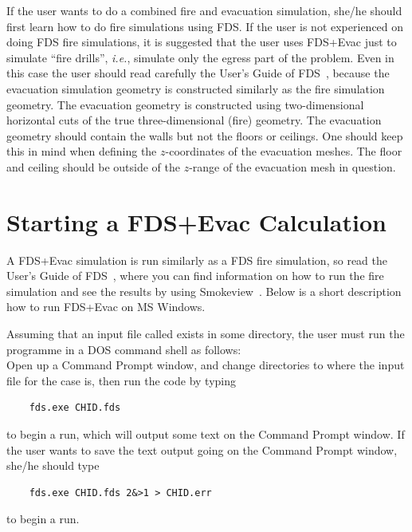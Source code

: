 \documentclass[12pt,a4paper,final,twoside]{stylevk}
\begin{document}
If the user wants to do a combined fire and evacuation simulation,
she/he should first learn how to do fire simulations using FDS.  If
the user is not experienced on doing FDS fire simulations, it is
suggested that the user uses FDS+Evac just to simulate ``fire
drills'', \emph{i.e.}, simulate only the egress part of the problem.
Even in this case the user should read carefully the User's Guide of
FDS~\cite{FDS_UserGuide}, because the evacuation simulation geometry
is constructed similarly as the fire simulation geometry.  The
evacuation geometry is constructed using two-dimensional horizontal
cuts of the true three-dimensional (fire) geometry.  The evacuation
geometry should contain the walls but not the floors or ceilings.  One
should keep this in mind when defining the $z$-coordinates of the
evacuation meshes.  The floor and ceiling should be outside of the
$z$-range of the evacuation mesh in question.


\section{Starting a FDS+Evac Calculation} 

\noindent A FDS+Evac simulation is run similarly as a FDS fire
simulation, so read the User's Guide of FDS~\cite{FDS_UserGuide},
where you can find information on how to run the fire simulation and
see the results by using Smokeview~\cite{SV_UserGuide}.  Below is a
short description how to run FDS+Evac on MS Windows.


Assuming that an input file called  exists in some
directory, the user must run the programme in a DOS command shell as
follows:\\
Open up a Command Prompt window, and change directories to where the
input file for the case is, then run the code by typing
\begin{verbatim}
    fds.exe CHID.fds
\end{verbatim}
to begin a run, which will output some text on the Command Prompt
window.  If the user wants to save the text output going on the
Command Prompt window, she/he should type
\begin{verbatim}
    fds.exe CHID.fds 2&>1 > CHID.err
\end{verbatim}
to begin a run.
\end{document}
